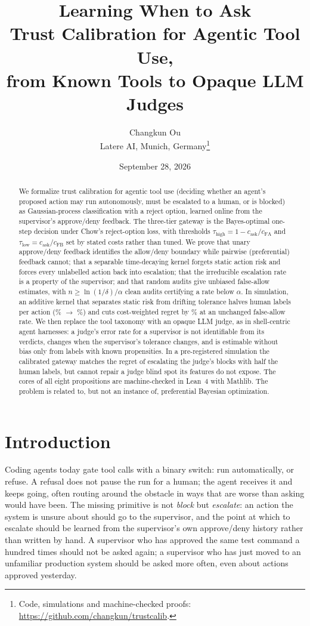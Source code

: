 \documentclass[11pt]{article}
\title{\textbf{Learning When to Ask}\\[4pt]
\large Trust Calibration for Agentic Tool Use,\\ from Known Tools to Opaque LLM Judges}
\author{Changkun Ou\\[2pt]
\small Latere AI, Munich, Germany\thanks{Code, simulations and
machine-checked proofs: \url{https://github.com/changkun/trustcalib}.}}
\date{September 28, 2026}
\begin{document}
\maketitle

\begin{abstract}
We formalize trust calibration for agentic tool use (deciding whether an
agent's proposed action may run autonomously, must be escalated to a human,
or is blocked) as Gaussian-process classification with a reject option,
learned online from the supervisor's approve/deny feedback. The three-tier
gateway is the Bayes-optimal one-step decision under Chow's reject-option
loss, with thresholds $\tau_{\text{high}} = 1 - c_{\text{ask}}/c_{\text{FA}}$
and $\tau_{\text{low}} = c_{\text{ask}}/c_{\text{FB}}$ set by stated costs
rather than tuned. We prove that unary approve/deny feedback identifies the
allow/deny boundary while pairwise (preferential) feedback cannot; that a
separable time-decaying kernel forgets static action risk and forces every
unlabelled action back into escalation; that the irreducible escalation rate
is a property of the supervisor; and that random audits give unbiased
false-allow estimates, with $n \ge \ln(1/\delta)/\alpha$ clean audits
certifying a rate below $\alpha$. In simulation, an additive kernel that
separates static risk from drifting tolerance halves human labels per action
(\resVLabels\% $\to$ \resALabels\%) and cuts cost-weighted regret by
\resRegretCut\% at an unchanged false-allow rate. We then replace the tool
taxonomy with an opaque LLM judge, as in shell-centric agent harnesses: a
judge's error rate for a supervisor is not identifiable from its verdicts,
changes when the supervisor's tolerance changes, and is estimable without
bias only from labels with known propensities. In a pre-registered
simulation the calibrated gateway matches the regret of escalating the
judge's blocks with half the human labels, but cannot repair a judge blind
spot its features do not expose. The cores of all eight propositions are
machine-checked in Lean~4 with Mathlib. The problem is related to, but not an
instance of, preferential Bayesian optimization.
\end{abstract}

\section{Introduction}\label{sec:intro}

Coding agents today gate tool calls with a binary switch: run automatically,
or refuse. A refusal does not pause the run for a human; the agent receives
it and keeps going, often routing around the obstacle in ways that are worse
than asking would have been. The missing primitive is not \emph{block} but
\emph{escalate}: an action the system is unsure about should go to the
supervisor, and the point at which to escalate should be learned from the
supervisor's own approve/deny history rather than written by hand. A
supervisor who has approved the same test command a hundred times should not
be asked again; a supervisor who has just moved to an unfamiliar production
system should be asked more often, even about actions approved yesterday.
\end{document}
